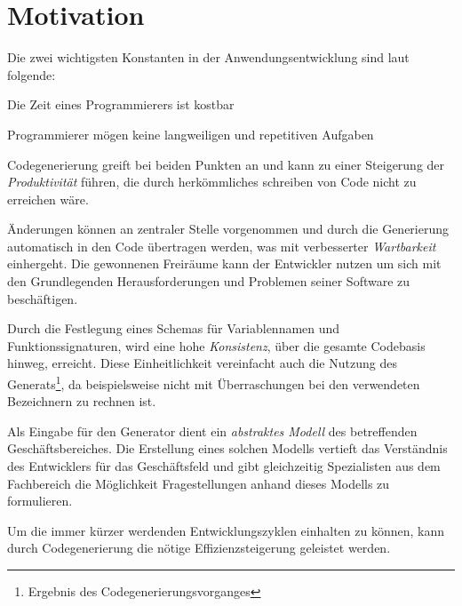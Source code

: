 \section{Motivation}
\label{sec:motivation}

Die zwei wichtigsten Konstanten in der Anwendungsentwicklung sind laut \parencite{herrington2003code} folgende:
\begin{compactitem}
    \item Die Zeit eines Programmierers ist kostbar
    \item Programmierer mögen keine langweiligen und repetitiven Aufgaben
\end{compactitem}
Codegenerierung greift bei beiden Punkten an und kann zu einer Steigerung der \emph{Produktivität} führen, die durch herkömmliches schreiben von Code nicht zu erreichen wäre. 

Änderungen können an zentraler Stelle vorgenommen und durch die Generierung automatisch in den Code übertragen werden, was mit verbesserter \emph{Wartbarkeit} einhergeht.
Die gewonnenen Freiräume kann der Entwickler nutzen um sich mit den Grundlegenden Herausforderungen und Problemen seiner Software zu beschäftigen.

Durch die Festlegung eines Schemas für Variablennamen und Funktionssignaturen, wird eine hohe \emph{Konsistenz}, über die gesamte Codebasis hinweg, erreicht.
Diese Einheitlichkeit vereinfacht auch die Nutzung des Generats\footnote{Ergebnis des Codegenerierungsvorganges}, da beispielsweise nicht mit Überraschungen bei den verwendeten Bezeichnern zu rechnen ist.

Als Eingabe für den Generator dient ein \emph{abstraktes Modell} des betreffenden Geschäftsbereiches. Die Erstellung eines solchen Modells vertieft das Verständnis des Entwicklers für das Geschäftsfeld und gibt gleichzeitig Spezialisten aus dem Fachbereich die Möglichkeit Fragestellungen anhand dieses Modells zu formulieren.

Um die immer kürzer werdenden Entwicklungszyklen einhalten zu können, kann durch Codegenerierung die nötige Effizienzsteigerung geleistet werden.